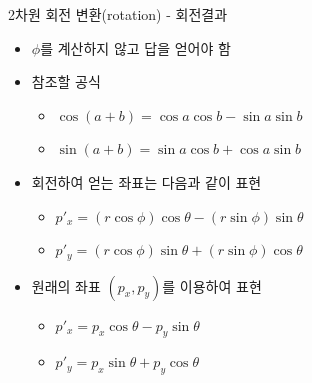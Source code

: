 \begin{frame}{2차원 회전 변환(rotation) - 회전결과}

\begin{itemize}
\item $\phi$를 계산하지 않고 답을 얻어야 함
\item 참조할 공식
	\begin{itemize}
	\item $\cos (a+b) = \cos a \cos b - \sin a \sin b$
	\item $\sin (a+b) = \sin a \cos b + \cos a \sin b$
	\end{itemize}
\item 회전하여 얻는 좌표는 다음과 같이 표현
	\begin{itemize}
	\item $p'_x = (r \cos \phi) \cos \theta - (r \sin \phi )\sin \theta$
	\item $p'_y = (r \cos \phi) \sin \theta + (r \sin \phi )\cos \theta$
	\end{itemize}
\item 원래의 좌표 $(p_x , p_y )$를 이용하여 표현
	\begin{itemize}
	\item $p'_x = p_x \cos \theta - p_y \sin \theta$
	\item $p'_y = p_x \sin \theta + p_y \cos \theta$
	\end{itemize} 
\end{itemize}



\end{frame}

